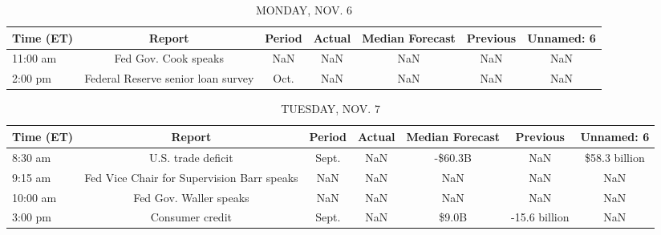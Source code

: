 \documentclass{article}%
\begin{document}
%
\normalsize%


\begin{table}[htbp]%
\caption{MONDAY, NOV. 6}%
\centering%
\begin{adjustbox}{width=1\textwidth}%
\begin{tabular}{lcccccc}
\toprule
Time (ET) &                             Report & Period & Actual & Median Forecast & Previous & Unnamed: 6 \\
\midrule
 11:00 am &               Fed Gov. Cook speaks &    NaN &    NaN &             NaN &      NaN &        NaN \\
  2:00 pm & Federal Reserve senior loan survey &   Oct. &    NaN &             NaN &      NaN &        NaN \\
\bottomrule
\end{tabular}
%
\end{adjustbox}%
\end{table}

%


\begin{table}[htbp]%
\caption{TUESDAY, NOV. 7}%
\centering%
\begin{adjustbox}{width=1\textwidth}%
\begin{tabular}{lcccccc}
\toprule
Time (ET) &                                     Report & Period & Actual & Median Forecast &      Previous &    Unnamed: 6 \\
\midrule
  8:30 am &                         U.S. trade deficit &  Sept. &    NaN &         -\$60.3B &           NaN & \$58.3 billion \\
  9:15 am & Fed Vice Chair for Supervision Barr speaks &    NaN &    NaN &             NaN &           NaN &           NaN \\
 10:00 am &                     Fed Gov. Waller speaks &    NaN &    NaN &             NaN &           NaN &           NaN \\
  3:00 pm &                            Consumer credit &  Sept. &    NaN &           \$9.0B & -15.6 billion &           NaN \\
\bottomrule
\end{tabular}
%
\end{adjustbox}%
\end{table}

%
\end{document}
